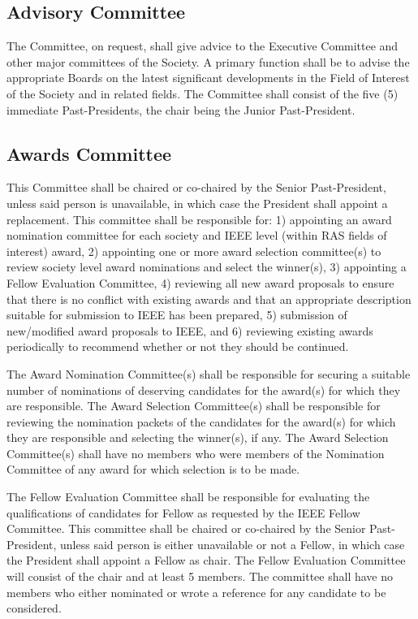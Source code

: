 \documentclass[10pt]{article}
\begin{document}
\subsection{Advisory Committee}

The Committee, on request, shall give advice to the Executive Committee and other major committees of the Society. A primary function shall be to advise the appropriate Boards on the latest significant developments in the Field of Interest of the Society and in related fields. The Committee shall consist of the five (5) immediate Past-Presidents, the chair being the Junior Past-President.

\subsection{Awards Committee}

This Committee shall be chaired or co-chaired by the Senior Past-President, unless said person is unavailable, in which case the President shall appoint a replacement. This committee shall be responsible for: 1) appointing an award nomination committee for each society and IEEE level (within RAS fields of interest) award, 2) appointing one or more award selection committee(s) to review society level award nominations and select the winner(s), 3) appointing a Fellow Evaluation Committee, 4) reviewing all new award proposals to ensure that  there is no conflict with existing awards and that an appropriate description suitable for submission to IEEE has been prepared, 5) submission of new/modified award proposals to IEEE, and 6) reviewing existing awards periodically to recommend whether or not they should be continued.  

The Award Nomination Committee(s) shall be responsible for securing a suitable number of nominations of deserving candidates for the award(s) for which they are responsible.  The Award Selection Committee(s) shall be responsible for reviewing the nomination packets of the candidates for the award(s) for which they are responsible and selecting the winner(s), if any. The Award Selection Committee(s) shall have no members who were members of the Nomination Committee of any award for which selection is to be made.

The Fellow Evaluation Committee shall be responsible for evaluating the qualifications of candidates for Fellow as requested by the IEEE Fellow Committee.  This committee shall be chaired or co-chaired by the Senior Past-President, unless said person is either unavailable or not a Fellow, in which case the President shall appoint a Fellow as chair. The Fellow Evaluation Committee will consist of the chair and at least 5 members. The committee shall have no members who either nominated or wrote a reference for any candidate to be considered.
\end{document}
